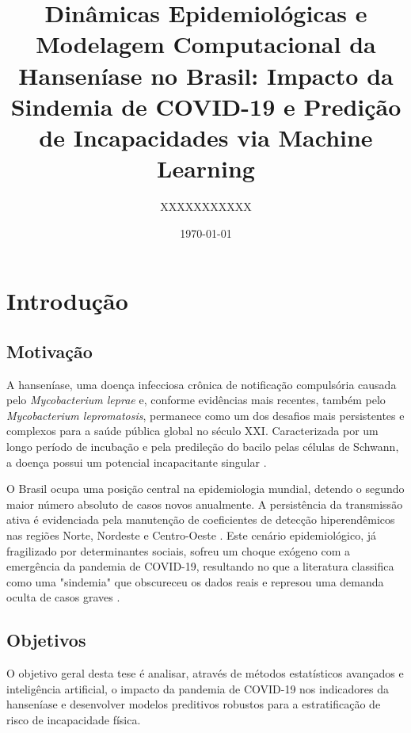 \documentclass[12pt, a4paper]{report}
\title{\textbf{Dinâmicas Epidemiológicas e Modelagem Computacional da Hanseníase no Brasil: Impacto da Sindemia de COVID-19 e Predição de Incapacidades via Machine Learning}}
\author{XXXXXXXXXXX}
\date{\today}
\begin{document}
\maketitle

\tableofcontents
\newpage

\chapter{Introdução}

\section{Motivação}
A hanseníase, uma doença infecciosa crônica de notificação compulsória causada pelo \textit{Mycobacterium leprae} e, conforme evidências mais recentes, também pelo \textit{Mycobacterium lepromatosis}, permanece como um dos desafios mais persistentes e complexos para a saúde pública global no século XXI. Caracterizada por um longo período de incubação e pela predileção do bacilo pelas células de Schwann, a doença possui um potencial incapacitante singular \citep{sousa2025interrupted, sczmanski2025clinical}. 

O Brasil ocupa uma posição central na epidemiologia mundial, detendo o segundo maior número absoluto de casos novos anualmente. A persistência da transmissão ativa é evidenciada pela manutenção de coeficientes de detecção hiperendêmicos nas regiões Norte, Nordeste e Centro-Oeste \citep{barbosa2025spatial, penna2020leprosy}. Este cenário epidemiológico, já fragilizado por determinantes sociais, sofreu um choque exógeno com a emergência da pandemia de COVID-19, resultando no que a literatura classifica como uma "sindemia" que obscureceu os dados reais e represou uma demanda oculta de casos graves \citep{deps2022backlog, abreu2025impacto}.

\section{Objetivos}
O objetivo geral desta tese é analisar, através de métodos estatísticos avançados e inteligência artificial, o impacto da pandemia de COVID-19 nos indicadores da hanseníase e desenvolver modelos preditivos robustos para a estratificação de risco de incapacidade física.
\end{document}
